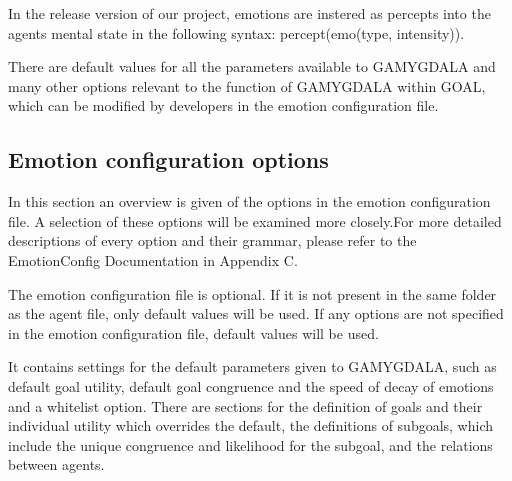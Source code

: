 \documentclass[11pt]{article}
\begin{document}
In the release version of our project, emotions are instered as percepts into the agents mental state in the following syntax: percept(emo(type, intensity)).

There are default values for all the parameters available to GAMYGDALA and many other options relevant to the function of GAMYGDALA within GOAL, which can be modified by developers in the emotion configuration file.


\subsection{Emotion configuration options}
In this section an overview is given of the options in the emotion configuration file. A selection of these options will be examined more closely.For more detailed descriptions of every option and their grammar, please refer to the EmotionConfig Documentation in Appendix C. 

The emotion configuration file is optional. If it is not present in the same folder as the agent file, only default values will be used. If any options are not specified in the emotion configuration file, default values will be used.

It contains settings for the default parameters given to GAMYGDALA, such as default goal utility, default goal congruence and the speed of decay of emotions and a whitelist option. There are sections for the definition of goals and their individual utility which overrides the default, the definitions of subgoals, which include the unique congruence and likelihood for the subgoal, and the relations between agents.
\end{document}
